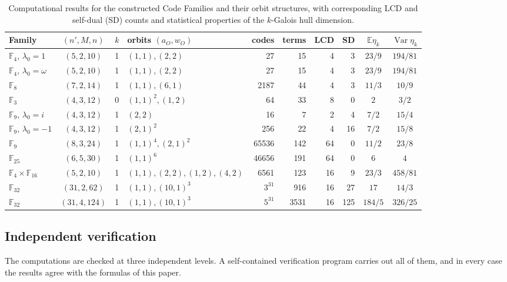 \documentclass[preprint,12pt,a4paper]{elsarticle}
\newcommand{\F}{\mathbb F}
\theoremstyle{definition}
\theoremstyle{remark}
\begin{document}
\begin{table}[!t]
\centering
\scriptsize
\setlength{\tabcolsep}{2.5pt}
\caption{Computational results for the constructed Code Families and their orbit structures, with corresponding LCD and self-dual (SD) counts and statistical properties of the \(k\)-Galois hull dimension.}
\label{tab:summary}
\begin{tabular}{lcclrrrrcc}
\toprule
Family & $(n',M,n)$ & $k$ & orbits $(a_O,w_O)$ & codes & terms & LCD & SD &
$\mathbb{E}\eta_k$ & $\operatorname{Var}\eta_k$\\
\midrule
$\F_4$, $\lambda_0{=}1$ & $(5,2,10)$ & 1 & $(1,1),(2,2)$ & 27 & 15 & 4 & 3 & $23/9$ & $194/81$\\
$\F_4$, $\lambda_0{=}\omega$ & $(5,2,10)$ & 1 & $(1,1),(2,2)$ & 27 & 15 & 4 & 3 & $23/9$ & $194/81$\\
$\F_8$ & $(7,2,14)$ & 1 & $(1,1),(6,1)$ & 2187 & 44 & 4 & 3 & $11/3$ & $10/9$\\
$\F_3$ & $(4,3,12)$ & 0 & $(1,1)^2,(1,2)$ & 64 & 33 & 8 & 0 & $2$ & $3/2$\\
$\F_9$, $\lambda_0{=}i$ & $(4,3,12)$ & 1 & $(2,2)$ & 16 & 7 & 2 & 4 & $7/2$ & $15/4$\\
$\F_9$, $\lambda_0{=}-1$ & $(4,3,12)$ & 1 & $(2,1)^2$ & 256 & 22 & 4 & 16 & $7/2$ & $15/8$\\
$\F_9$ & $(8,3,24)$ & 1 & $(1,1)^4,(2,1)^2$ & 65536 & 142 & 64 & 0 & $11/2$ & $23/8$\\
$\F_{25}$ & $(6,5,30)$ & 1 & $(1,1)^6$ & 46656 & 191 & 64 & 0 & $6$ & $4$\\
$\F_4{\times}\F_{16}$ & $(5,2,10)$ & 1 & $(1,1),(2,2),(1,2),(4,2)$ & 6561 & 123 & 16 & 9 & $23/3$ & $458/81$\\
$\F_{32}$ & $(31,2,62)$ & 1 & $(1,1),(10,1)^3$ & $3^{31}$ & 916 & 16 & 27 & $17$ & $14/3$\\
$\F_{32}$ & $(31,4,124)$ & 1 & $(1,1),(10,1)^3$ & $5^{31}$ & 3531 & 16 & 125 & $184/5$ & $326/25$\\
\bottomrule
\end{tabular}
\end{table}

\subsection{Independent verification}\label{sec:verification}
The computations are checked at three independent levels.  A self-contained
verification program carries out all of them, and in every case the results
agree with the formulas of this paper.
\end{document}
